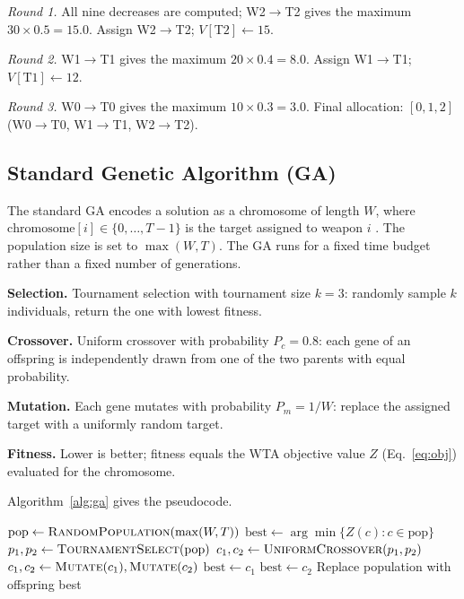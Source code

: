 \documentclass[10pt,conference]{IEEEtran}
\begin{document}
\emph{Round 1.} All nine decreases are computed; W2$\to$T2 gives the maximum
$30 \times 0.5 = 15.0$.  Assign W2$\to$T2; $V[\text{T2}] \leftarrow 15$.

\emph{Round 2.} W1$\to$T1 gives the maximum $20 \times 0.4 = 8.0$.
Assign W1$\to$T1; $V[\text{T1}] \leftarrow 12$.

\emph{Round 3.} W0$\to$T0 gives the maximum $10 \times 0.3 = 3.0$.
Final allocation: $[0, 1, 2]$ (W0$\to$T0, W1$\to$T1, W2$\to$T2).

\subsection{Standard Genetic Algorithm (GA)}
\label{sec:ga}

The standard GA encodes a solution as a chromosome of length $W$, where
$\text{chromosome}[i] \in \{0, \ldots, T{-}1\}$ is the target assigned to
weapon $i$ \cite{kline2020,bogdanowicz2013}.  The population size is set to
$\max(W, T)$.  The GA runs for a fixed time budget rather than a fixed number
of generations.

\textbf{Selection.} Tournament selection with tournament size $k = 3$:
randomly sample $k$ individuals, return the one with lowest fitness.

\textbf{Crossover.} Uniform crossover with probability $P_c = 0.8$: each
gene of an offspring is independently drawn from one of the two parents with
equal probability.

\textbf{Mutation.} Each gene mutates with probability $P_m = 1/W$: replace
the assigned target with a uniformly random target.

\textbf{Fitness.} Lower is better; fitness equals the WTA objective value $Z$
(Eq.~\ref{eq:obj}) evaluated for the chromosome.

Algorithm~\ref{alg:ga} gives the pseudocode.

\begin{algorithm}[htbp]
  \caption{Standard Genetic Algorithm for WTA}
  \label{alg:ga}
  \begin{algorithmic}[1]
    \State $\text{pop} \leftarrow \textsc{RandomPopulation}(\max(W,T))$
    \State $\text{best} \leftarrow \arg\min \{Z(c) : c \in \text{pop}\}$
      \State $p_1, p_2 \leftarrow \textsc{TournamentSelect}(\text{pop})$
      \State $c_1, c_2 \leftarrow \textsc{UniformCrossover}(p_1, p_2)$
      \State $c_1, c_2 \leftarrow \textsc{Mutate}(c_1), \textsc{Mutate}(c_2)$
       $\text{best} \leftarrow c_1$ \EndIf
       $\text{best} \leftarrow c_2$ \EndIf
      \State Replace population with offspring
    \EndWhile
    \State \Return best
  \end{algorithmic}
\end{algorithm}
\end{document}
